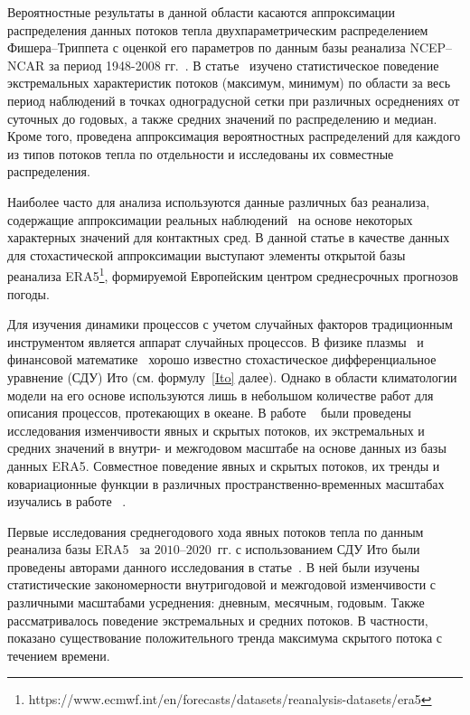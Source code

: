 Вероятностные результаты в данной области касаются аппроксимации распределения данных потоков тепла двухпараметрическим распределением Фишера--Триппета с оценкой его параметров по данным базы реанализа NCEP--NCAR за период 1948-2008 гг.~\cite{gulev2012probability}. В статье~\cite{FAO} изучено статистическое поведение экстремальных характеристик потоков (максимум, минимум) по области за весь период наблюдений в точках одноградусной сетки при различных осреднениях от суточных до годовых, а также средних значений по распределению и медиан. Кроме того, проведена аппроксимация вероятностных распределений для каждого из типов потоков тепла по отдельности и исследованы их совместные распределения.

Наиболее часто для анализа используются данные различных баз реанализа, содержащие аппроксимации реальных наблюдений~\cite{cronin2019air,leyba2019trends} на основе некоторых характерных значений для контактных сред. В данной статье в качестве данных для стохастической аппроксимации выступают элементы открытой базы реанализа ERA5\footnote{https://www.ecmwf.int/en/forecasts/datasets/reanalysis-datasets/era5}, формируемой Европейским центром среднесрочных прогнозов погоды.

Для изучения динамики процессов с учетом случайных факторов традиционным инструментом является аппарат случайных процессов. В физике плазмы~\cite{Espinos2018,Sexty2019} и финансовой математике~\cite{Bouchaud1998} хорошо известно стохастическое дифференциальное уравнение (СДУ) Ито (см. формулу~\eqref{Ito} далее). Однако в области климатологии модели на его основе используются лишь в небольшом количестве работ для описания процессов, протекающих в океане. В работе ~\cite{van2021characterisation} были проведены исследования изменчивости явных и скрытых потоков, их экстремальных и средних значений в внутри- и межгодовом масштабе на основе данных из базы данных ERA5. Совместное поведение явных и скрытых потоков, их тренды и ковариационные функции в различных пространственно-временных масштабах изучались в работе ~\cite{toppaladoddi2021stochastic}. 

Первые исследования среднегодового хода явных потоков тепла по данным реанализа базы ERA5~\cite{hersbach2020era5} за $2010$--$2020$~гг. с использованием СДУ Ито были проведены авторами данного исследования в статье~\cite{2021_SOME_FEATURES}. В ней были изучены статистические закономерности внутригодовой и межгодовой изменчивости с различными масштабами усреднения: дневным, месячным, годовым. Также рассматривалось поведение экстремальных и средних потоков. В частности, показано существование положительного тренда максимума скрытого потока с течением времени. 

